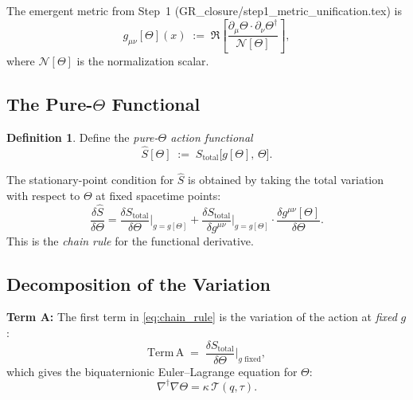 \documentclass[12pt]{article}
\theoremstyle{definition}
\newtheorem{definition}[theorem]{Definition}
\theoremstyle{remark}
\begin{document}
The emergent metric from Step~1 (GR\_closure/step1\_metric\_unification.tex) is
\begin{equation}
  g_{\mu\nu}[\Theta](x)
  \;:=\; \Re\!\left[\frac{\partial_\mu\Theta\cdot\partial_\nu\Theta^\dagger}{\mathcal{N}[\Theta]}\right],
  \label{eq:g_from_Theta}
\end{equation}
where $\mathcal{N}[\Theta]$ is the normalization scalar.

\subsection{The Pure-$\Theta$ Functional}

\begin{definition}
Define the \emph{pure-$\Theta$ action functional}
\begin{equation}
  \hat{S}[\Theta]
  \;:=\; S_{\text{total}}\bigl[g[\Theta],\,\Theta\bigr].
  \label{eq:S_hat}
\end{equation}
\end{definition}

The stationary-point condition for $\hat{S}$ is obtained by taking the total variation
with respect to $\Theta$ at fixed spacetime points:
\begin{equation}
  \frac{\delta\hat{S}}{\delta\Theta}
  = \frac{\delta S_{\text{total}}}{\delta\Theta}\bigg|_{g=g[\Theta]}
  + \frac{\delta S_{\text{total}}}{\delta g^{\mu\nu}}\bigg|_{g=g[\Theta]}
    \cdot\frac{\delta g^{\mu\nu}[\Theta]}{\delta\Theta}.
  \label{eq:chain_rule}
\end{equation}
This is the \emph{chain rule} for the functional derivative.

\subsection{Decomposition of the Variation}

\textbf{Term A:} The first term in \eqref{eq:chain_rule} is the variation of the
action at \emph{fixed} $g$:
\begin{equation}
  \mathrm{Term\,A} \;=\; \frac{\delta S_{\text{total}}}{\delta\Theta}\bigg|_{g \text{ fixed}},
\end{equation}
which gives the biquaternionic Euler--Lagrange equation for $\Theta$:
\begin{equation}
  \nabla^\dagger\nabla\Theta = \kappa\,\mathcal{T}(q,\tau).
  \label{eq:EL_Theta}
\end{equation}
\end{document}
